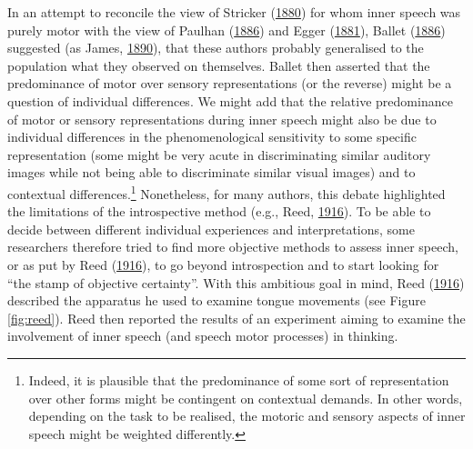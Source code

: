 \documentclass[a4paper,12pt,twoside,onecolumn,openright,final,oldfontcommands]{memoir}
\let\rmarkdownfootnote\footnote%
\def\footnote{\protect\rmarkdownfootnote}
\begin{document}
In an attempt to reconcile the view of Stricker (\protect\hyperlink{ref-stricker_studien_1880}{1880}) for whom inner speech was purely motor with the view of Paulhan (\protect\hyperlink{ref-paulhan_langage_1886}{1886}) and Egger (\protect\hyperlink{ref-egger_parole_1881}{1881}), Ballet (\protect\hyperlink{ref-ballet_langage_1886}{1886}) suggested (as James, \protect\hyperlink{ref-james_principles_1890}{1890}), that these authors probably generalised to the population what they observed on themselves. Ballet then asserted that the predominance of motor over sensory representations (or the reverse) might be a question of individual differences. We might add that the relative predominance of motor or sensory representations during inner speech might also be due to individual differences in the phenomenological sensitivity to some specific representation (some might be very acute in discriminating similar auditory images while not being able to discriminate similar visual images) and to contextual differences.\footnote{Indeed, it is plausible that the predominance of some sort of representation over other forms might be contingent on contextual demands. In other words, depending on the task to be realised, the motoric and sensory aspects of inner speech might be weighted differently.} Nonetheless, for many authors, this debate highlighted the limitations of the introspective method (e.g., Reed, \protect\hyperlink{ref-reed_existence_1916}{1916}). To be able to decide between different individual experiences and interpretations, some researchers therefore tried to find more objective methods to assess inner speech, or as put by Reed (\protect\hyperlink{ref-reed_existence_1916}{1916}), to go beyond introspection and to start looking for \enquote{the stamp of objective certainty}. With this ambitious goal in mind, Reed (\protect\hyperlink{ref-reed_existence_1916}{1916}) described the apparatus he used to examine tongue movements (see Figure \ref{fig:reed}). Reed then reported the results of an experiment aiming to examine the involvement of inner speech (and speech motor processes) in thinking.
\end{document}
